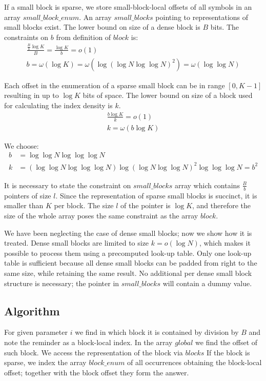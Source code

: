 If a small block is sparse, we store small-block-local offsets of all symbols \ph{} in an array $small\_block\_enum$.
An array $small\_blocks$ pointing to representations of small blocks exist.
The lower bound on size of a dense block is $B$ bits.
The constraints on $b$ from definition of $block$ is:
\begin{gather*}
\frac{\frac{B}{b} \log K}{B} = \frac{\log K}{b} = o(1) \\
b = \omega(\log K) = \omega(\log(\log N \log \log N)^2) = \omega(\log \log N)
\end{gather*}

Each offset in the enumeration of a sparse small block can be in range $[0, K-1]$ resulting in up to $\log K$ bits of space.
The lower bound on size of a block used for calculating the index density is $k$.
\begin{gather*}
\frac{b \log K}{k} = o(1) \\
k = \omega(b\log K)
\end{gather*}

We choose:
\begin{align*}
b &= \log \log N \log \log \log N \\
k &= (\log \log N \log \log \log N) \log(\log N \log \log N)^2 \log \log \log N = b^2
\end{align*}

It is necessary to state the constraint on $small\_blocks$ array which contains $\frac{B}{b}$ pointers of size $l$.
Since the representation of sparse small blocks is succinct, it is smaller than $K$ per block.
The size $l$ of the pointer is $\log K$, and therefore the size of the whole array poses the same constraint as the array $block$.

We have been neglecting the case of dense small blocks; now we show how it is treated.
Dense small blocks are limited to size $k = o(\log N)$, which makes it possible to process them using a precomputed look-up table.
Only one look-up table is sufficient because all dense small blocks can be padded from right to the same size, while retaining the same result.
No additional per dense small block structure is necessary; the pointer in $small\_blocks$ will contain a dummy value.

\subsection{Algorithm}

For given parameter $i$ we find in which block it is contained by division by $B$ and note the reminder as a block-local index.
In the array $global$ we find the offset of such block.
We access the representation of the block via $blocks$
If the block is sparse, we index the array $block\_enum$ of all occurrences obtaining the block-local offset; together with the block offset they form the answer.

